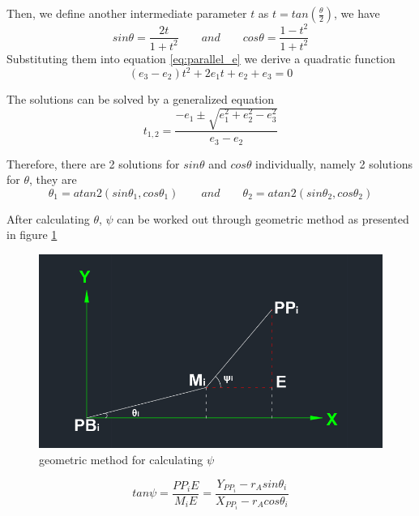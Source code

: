 \documentclass{article}
\begin{document}
Then, we define another intermediate parameter $t$ as $t=tan(\frac{\theta}{2})$, we have
\begin{equation}
sin\theta=\frac{2t}{1+t^2}\qquad and \qquad cos\theta=\frac{1-t^2}{1+t^2}
\end{equation}
Substituting them into equation \ref{eq:parallel_e} we derive a quadratic function 
\begin{equation}
(e_3-e_2)t^2+2e_1t+e_2+e_3=0
\end{equation}

The solutions can be solved by a generalized equation
\begin{equation}
t_{1,2}=\frac{-e_1\pm\sqrt{e_1^2+e_2^2-e_3^2}}{e_3-e_2}
\end{equation}

Therefore, there are 2 solutions for $sin\theta$ and $cos\theta$ individually, namely 2 solutions for $\theta$, they are
\begin{equation}
\theta_1 = atan2(sin\theta_1,cos\theta_1)\qquad and \qquad \theta_2 = atan2(sin\theta_2,cos\theta_2)
\end{equation}

After calculating $\theta$, $\psi$ can be worked out through geometric method as presented in figure \ref{fig:Parallel_psi}
\begin{figure}[htbp] 
\begin{center}
\includegraphics[width=\textwidth]{images/Parallel_psi}
\caption{geometric method for calculating $\psi$}
\label{fig:Parallel_psi}
\end{center}
\end{figure}

\begin{equation}
tan\psi = \frac{PP_iE}{M_iE}=\frac{Y_{PP_i}-r_Asin\theta_i}{X_{PP_i}-r_Acos\theta_i}
\end{equation}
\end{document}
